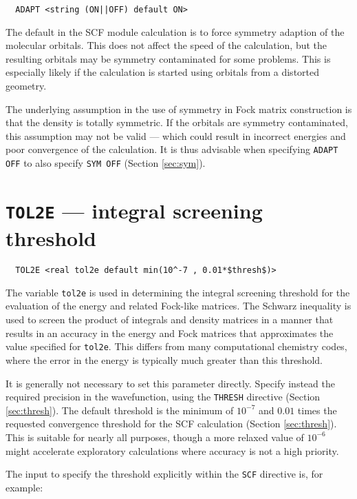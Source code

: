 \begin{verbatim}
  ADAPT <string (ON||OFF) default ON>
\end{verbatim}

The default in the SCF module calculation is to force symmetry
adaption of the molecular orbitals. This does not affect the speed of
the calculation, but the resulting orbitals may be symmetry
contaminated for some problems.  This is especially likely if the
calculation is started using orbitals from a distorted geometry.

The underlying assumption in the use of symmetry in Fock matrix
construction is that the density is totally symmetric.  If the orbitals
are symmetry contaminated, this assumption may not be valid --- which
could result in incorrect energies and poor convergence of the
calculation.  It is thus advisable when specifying \verb+ADAPT OFF+ to
also specify \verb+SYM OFF+ (Section \ref{sec:sym}).

\section{{\tt TOL2E} --- integral screening threshold}
\label{sec:tol2e}

\begin{verbatim}
  TOL2E <real tol2e default min(10^-7 , 0.01*$thresh$)>
\end{verbatim}

The variable \verb+tol2e+ is used in determining the integral
screening threshold for the evaluation of the energy and related
Fock-like matrices.  The Schwarz inequality is used to screen the
product of integrals and density matrices in a manner that results in
an accuracy in the energy and Fock matrices that approximates the
value specified for \verb+tol2e+.  This differs from many
computational chemistry codes, where the error in the energy is
typically much greater than this threshold.

It is generally not necessary to set this parameter directly.  Specify
instead the required precision in the wavefunction, using the
\verb+THRESH+ directive (Section \ref{sec:thresh}). The default
threshold is the minimum of $10^{-7}$ and $0.01$ times the requested
convergence threshold for the SCF calculation (Section
\ref{sec:thresh}).  This is suitable for nearly all purposes, though a
more relaxed value of $10^{-6}$ might accelerate exploratory
calculations where accuracy is not a high priority.

The input to specify the threshold explicitly within the \verb+SCF+
directive is, for example:

